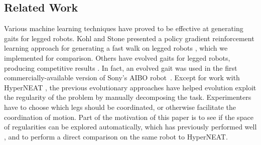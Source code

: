 \subsection{Related Work}

Various machine learning techniques have proved to be effective at
generating gaits for legged robots. Kohl and Stone presented a policy
gradient reinforcement learning approach for generating a fast walk on
legged robots \citep{kohl}, which we implemented for comparison. Others
have evolved gaits for legged robots, producing competitive
results \citep{chernova2005evolutionary, hornby2005autonomous, zykov,
  clune2009evolving, clune2011performance, clune2009hybrid,
  clune2009sensitivity, tellez2006evolving, valsalam2008modular}. In
fact, an evolved gait was used in the first commercially-available
version of Sony's AIBO robot~\citep{hornby2005autonomous}. Except for
work with HyperNEAT \citep{clune2009evolving, clune2011performance,
  clune2009hybrid, clune2009sensitivity}, the previous evolutionary
approaches have helped evolution exploit the regularity of the problem
by manually decomposing the task. Experimenters have
to choose which legs should be coordinated, or otherwise facilitate
the coordination of motion. Part of the motivation of this paper
is to see if the space of regularities can be explored automatically,
which has previously performed well \citep{valsalam2008modular}, and to
perform a direct comparison on the same robot to HyperNEAT.

